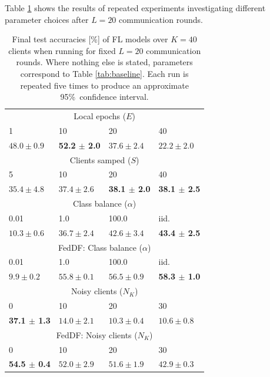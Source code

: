 \documentclass{article}
\begin{document}
Table \ref{tab:main} shows the results of repeated experiments investigating different parameter choices after $L=20$ communication rounds.
\begin{table}[htb!]
    \centering
    \begin{tabular}{llll}
       \hline
        \multicolumn{4}{c}{Local epochs ($E$)}\\
        1 & 10 & 20 & 40 \\
       \hline
$48.0 \pm 0.9$ & \textbf{ 52.2 $\pm$ 2.0 } & $37.6 \pm 2.4$ & $22.2 \pm 2.0$ \\
        \multicolumn{4}{c}{Clients samped ($S$)}\\
        5 & 10 & 20 & 40 \\
       \hline
        $35.4 \pm 4.8$ & $37.4 \pm 2.6$ & \textbf{ 38.1 $\pm$ 2.0 } & \textbf{ 38.1 $\pm$ 2.5 } \\
        \multicolumn{4}{c}{Class balance ($\alpha$)}\\
        0.01 & 1.0 & 100.0 & iid. \\
       \hline
        $10.3 \pm 0.6$ & $36.7 \pm 2.4$ & $42.6 \pm 3.4$ & \textbf{ 43.4 $\pm$ 2.5  }\\
        \multicolumn{4}{c}{FedDF: Class balance ($\alpha$)}\\
        0.01 & 1.0 & 100.0 & iid. \\
       \hline
        $9.9 \pm 0.2$ & $55.8 \pm 0.1$ & $56.5 \pm 0.9$ & \textbf{ 58.3 $\pm$ 1.0 } \\
        \multicolumn{4}{c}{Noisy clients ($N_K$)}\\
        0 & 10 & 20 & 30 \\
       \hline
        \textbf{ 37.1 $\pm$ 1.3 } & $14.0 \pm 2.1$ & $10.3 \pm 0.4$ & $10.6 \pm 0.8$ \\
        \multicolumn{4}{c}{FedDF: Noisy clients ($N_K$)}\\
        0 & 10 & 20 & 30 \\
       \hline
        \textbf{ 54.5 $\pm $ 0.4 } & $52.0 \pm 2.9$ & $51.6 \pm 1.9$ & $42.9 \pm 0.3$ \\
\end{tabular}
    \caption{
    Final test accuracies [\%] of FL models over $K=40$ clients when running for fixed $L=20$ communication rounds.
    Where nothing else is stated, parameters correspond to Table \ref{tab:baseline}.
    Each run is repeated five times to produce an approximate 95\%\ confidence interval.
    }
    \label{tab:main}
\end{table}
\end{document}
